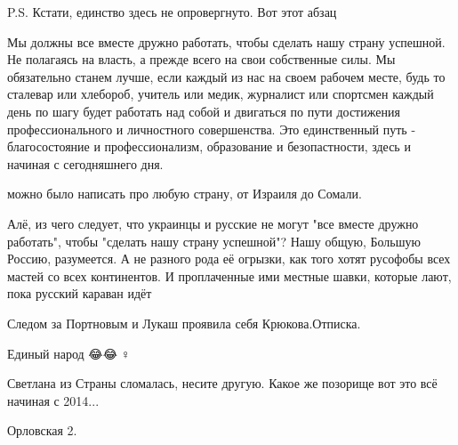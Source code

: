 \begin{itemize}
P.S. Кстати, единство здесь не опровергнуто. Вот этот абзац

Мы должны все вместе дружно работать, чтобы сделать нашу страну успешной. Не
полагаясь на власть, а прежде всего на свои собственные силы. Мы обязательно
станем лучше, если каждый из нас на своем рабочем месте, будь то сталевар или
хлебороб, учитель или медик, журналист или спортсмен каждый день по шагу будет
работать над собой и двигаться по пути достижения профессионального и
личностного совершенства. Это единственный путь - благосостояние и
профессионализм, образование и безопастности, здесь и начиная с сегодняшнего
дня.

можно было написать про любую страну, от Израиля до Сомали.

Алё, из чего следует, что украинцы и русские не могут "все вместе дружно
работать", чтобы "сделать нашу страну успешной"? Нашу общую, Большую Россию,
разумеется. А не разного рода её огрызки, как того хотят русофобы всех мастей
со всех континентов. И проплаченные ими местные шавки, которые лают, пока
русский караван идёт

 
Следом за Портновым и Лукаш проявила себя Крюкова.Отписка.

 

Единый народ 😂😂🤦♀️

Светлана из Страны сломалась, несите другую. Какое же позорище вот это всё
начиная с 2014...

 
Орловская 2.

 


\end{itemize}
